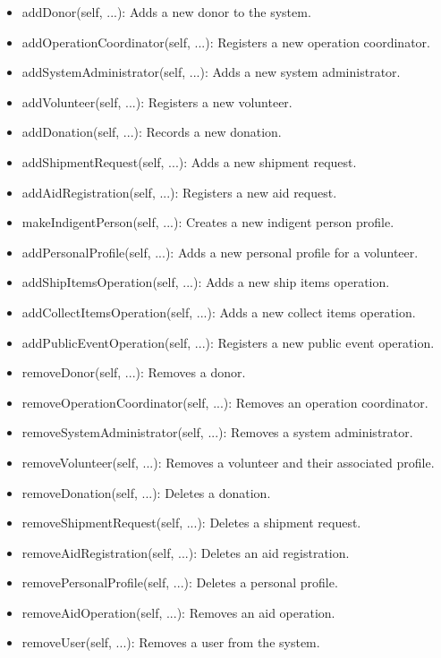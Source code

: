 \documentclass[a4paper,12pt]{report}
\begin{document}
\begin{itemize}
				\item	addDonor(self, ...): Adds a new donor to the system.
				\item	addOperationCoordinator(self, ...): Registers a new operation coordinator.
				\item	addSystemAdministrator(self, ...): Adds a new system administrator.
				\item	addVolunteer(self, ...): Registers a new volunteer.
				\item	addDonation(self, ...): Records a new donation.
				\item	addShipmentRequest(self, ...): Adds a new shipment request.
				\item	addAidRegistration(self, ...): Registers a new aid request.
				\item	makeIndigentPerson(self, ...): Creates a new indigent person profile.
				\item	addPersonalProfile(self, ...): Adds a new personal profile for a volunteer.
				\item	addShipItemsOperation(self, ...): Adds a new ship items operation.
				\item	addCollectItemsOperation(self, ...): Adds a new collect items operation.
				\item	addPublicEventOperation(self, ...): Registers a new public event operation.
				
				\item	removeDonor(self, ...): Removes a donor.
				\item	removeOperationCoordinator(self, ...): Removes an operation coordinator.
				\item	removeSystemAdministrator(self, ...): Removes a system administrator.
				\item	removeVolunteer(self, ...): Removes a volunteer and their associated profile.
				\item	removeDonation(self, ...): Deletes a donation.
				\item	removeShipmentRequest(self, ...): Deletes a shipment request.
				\item	removeAidRegistration(self, ...): Deletes an aid registration.
				\item	removePersonalProfile(self, ...): Deletes a personal profile.
				\item	removeAidOperation(self, ...): Removes an aid operation.
				\item	removeUser(self, ...): Removes a user from the system.
			
			\end{itemize}
			
		
\end{document}
